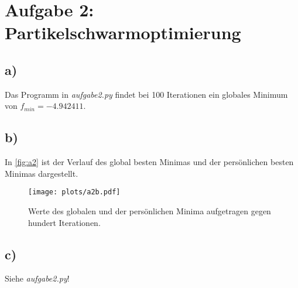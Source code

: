 \newpage
\section{Aufgabe 2: Partikelschwarmoptimierung}
\label{sec:auf2}

\subsection{a)}
Das Programm in \textit{aufgabe2.py} findet bei 100 Iterationen ein globales Minimum von $f_{min} = -4.942411$.
\subsection{b)}
In \autoref{fig:a2} ist der Verlauf des global besten Minimas und der persönlichen besten Minimas dargestellt.
\begin{figure}[H]
    \centering
    \texttt{[image: plots/a2b.pdf]}
    \caption{Werte des globalen und der persönlichen Minima aufgetragen gegen hundert Iterationen.}
    \label{fig:a2}
\end{figure}
\subsection{c)}
Siehe \textit{aufgabe2.py}!